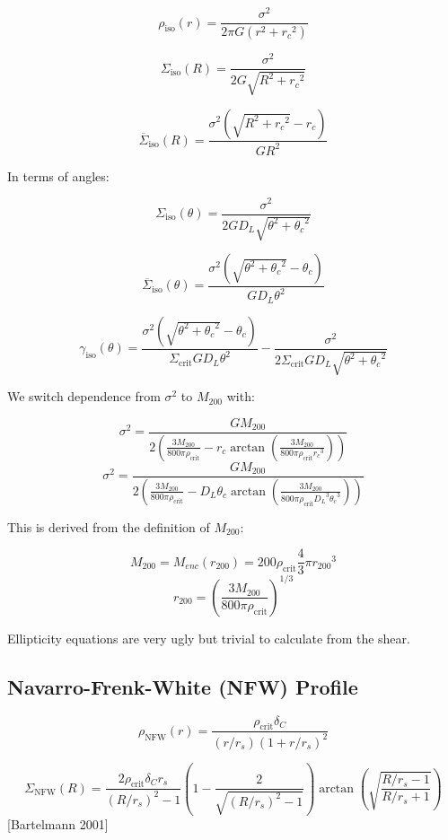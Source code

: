 \documentclass[]{article}
\begin{document}
\[\rho_\mathrm{iso}(r) = \frac{\sigma^2}{2\pi G (r^2 + {r_c}^2)}\]

\[\Sigma_\mathrm{iso}(R) = \frac{\sigma^2}{2 G \sqrt{R^2 + {r_c}^2}}\]

\[\overline{\Sigma}_\mathrm{iso}(R) = \frac{\sigma^2 \left(\sqrt{R^2 + {r_c}^2} - r_c \right)}{G R^2}\]

In terms of angles:

\[\Sigma_\mathrm{iso}(\theta) = \frac{\sigma^2}{2 G D_L \sqrt{\theta^2 + {\theta_c}^2}}\]

\[\overline{\Sigma}_\mathrm{iso}(\theta) = \frac{\sigma^2 \left(\sqrt{\theta^2 + {\theta_c}^2} - \theta_c \right)}{G D_L \theta^2}\]

\[\gamma_\mathrm{iso}(\theta) = \frac{\sigma^2 \left(\sqrt{\theta^2 + {\theta_c}^2} - \theta_c \right)}{\Sigma_\mathrm{crit} G D_L \theta^2} - \frac{\sigma^2}{2 \Sigma_\mathrm{crit} G D_L \sqrt{\theta^2 + {\theta_c}^2}}\]

We switch dependence from $\sigma^2$ to $M_{200}$ with:

\[\sigma^2 = \frac{G M_{200}}{2 \left(
    \frac{3 M_{200}}{800 \pi \rho_\mathrm{crit}}
    - r_c \arctan \left(
        \frac{3 M_{200}}{800 \pi \rho_\mathrm{crit} {r_c}^3}
    \right)
\right)}\]
\[\sigma^2 = \frac{G M_{200}}{2 \left(
    \frac{3 M_{200}}{800 \pi \rho_\mathrm{crit}}
    - D_L \theta_c \arctan \left(
        \frac{3 M_{200}}{800 \pi \rho_\mathrm{crit} {D_L}^3 {\theta_c}^3}
    \right)
\right)}\]

This is derived from the definition of $M_{200}$:

\[M_{200} = M_{enc}(r_{200}) = 200 \rho_\mathrm{crit} \frac{4}{3} \pi {r_{200}}^3\]
\[r_{200} = \left( \frac{3 M_{200}}{800 \pi \rho_\mathrm{crit}} \right)^{1/3}\]

Ellipticity equations are very ugly but trivial to calculate from the shear.



\subsection{Navarro-Frenk-White (NFW) Profile}

\[\rho_\mathrm{NFW}(r) = \frac{\rho_\mathrm{crit} \delta_C}{(r/r_s)\left(1 + r/r_s\right)^2}\]

\[\Sigma_\mathrm{NFW}(R) = \frac{2 \rho_\mathrm{crit} \delta_C r_s}{(R/r_s)^2 - 1} \left(1 - \frac{2}{\sqrt{(R/r_s)^2 - 1}} \right) \arctan\left(\sqrt{\frac{R/r_s - 1}{R/r_s + 1}} \right)\]
[Bartelmann 2001]
\end{document}
